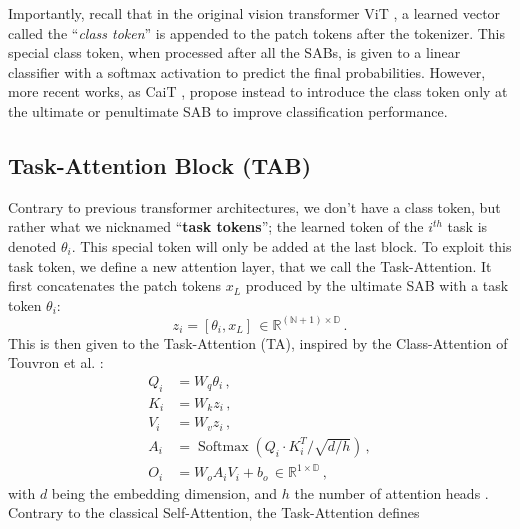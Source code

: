 Importantly, recall that in the original vision transformer ViT \citep{dosovitskiy2020vit}, a learned
vector called the ``\textit{class token}'' is appended to the patch tokens after the tokenizer. This
special class token, when processed after all the SABs, is given to a linear classifier with a
softmax activation to predict the final probabilities. However, more recent works, as CaiT
\citep{touvron2021cait}, propose instead to introduce the class token only at the ultimate or
penultimate SAB to improve classification performance.

\subsection{Task-Attention Block (TAB)}
\label{sec:dytox_tab}

Contrary to previous transformer architectures, we don't have a class token, but rather what we
nicknamed ``\textbf{task tokens}''; the learned token of the $i^{th}$ task is denoted $\theta_i$.
This special token will only be added at the last block. To exploit this task token, we define a new
attention layer, that we call the Task-Attention. It first concatenates the patch tokens $x_L$
produced by the ultimate SAB with a task token $\theta_i$:
%
\begin{equation}
    z_i = [\theta_i, x_L] \, \in \mathbb{R}^{(\mathbb{N} + 1) \times \mathbb{D}}\,.
    \label{eq:dytox_concat_cls_token}
\end{equation}
%
This is then given to the Task-Attention (TA), inspired by the Class-Attention of Touvron et al.
\citep{touvron2021cait}:
%
\begin{equation}
    \begin{aligned}
        Q_i & =W_{q} \theta_i\,,                                                      \\
        K_i & =W_{k} z_i\,,                                                           \\
        V_i & =W_{v} z_i\,,                                                           \\
        A_i & =\operatorname{Softmax}\left(Q_i \cdot K_i^{T} / \sqrt{d / h}\right)\,, \\
        O_i & = W_{o} A_i V_i+b_{o} \, \in \mathbb{R}^{1 \times \mathbb{D}}\,,
    \end{aligned}
    \label{eq:dytox_ca_layer}
\end{equation}
%
with $d$ being the embedding dimension, and $h$ the number of attention heads
\citep{vaswani2017transformer}. Contrary to the classical Self-Attention, the Task-Attention defines
